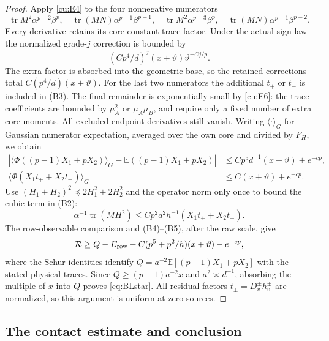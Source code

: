 \documentclass[10pt]{article}
\numberwithin{equation}{section}
\newcommand{\1}{\mathbf1}
\begin{document}
\begin{proof}
Apply \eqref{cu:E4} to the four nonnegative numerators
\[
 \operatorname{tr}M^2\alpha^{p-2}\beta^p,\quad
 \operatorname{tr}(MN)\alpha^{p-1}\beta^{p-1},\quad
 \operatorname{tr}M^2\alpha^{p-3}\beta^p,\quad
 \operatorname{tr}(MN)\alpha^{p-1}\beta^{p-2}.
\]
Every derivative retains its core-constant trace factor. Under the
actual sign law the normalized grade-$j$ correction is bounded by
\[
 (Cp^4/d)^j(x+\vartheta)\vartheta^{-Cj/p}.
\]
The extra factor is absorbed into the geometric base, so the retained
corrections total $C(p^4/d)(x+\vartheta)$.
For the last two numerators the additional $t_+$ or $t_-$ is included
in (B3). The final remainder is exponentially small by \eqref{cu:E6}:
the trace coefficients are bounded by $\mu_A^2$ or $\mu_A\mu_B$,
and require only a fixed number of extra core moments.
All excluded endpoint derivatives still vanish.
Writing $\langle\cdot\rangle_G$ for Gaussian numerator expectation,
averaged over the own core and divided by $F_H$, we obtain
\[
 \begin{aligned}
 \left|\langle\Phi((p-1)X_1+pX_2)\rangle_G
       -\mathbb E((p-1)X_1+pX_2)\right|
 &\le Cp^5d^{-1}(x+\vartheta)+e^{-cp},\\
 \langle\Phi(X_1t_++X_2t_-)\rangle_G
 &\le C(x+\vartheta)+e^{-cp}.
 \end{aligned}
 \tag{B4}
\]
Use $(H_1+H_2)^2\preceq2H_1^2+2H_2^2$ and the operator norm only
once to bound the cubic term in (B2):
\[
 \alpha^{-1}\operatorname{tr}(MH^2)
 \le Cp^2a^2h^{-1}(X_1t_++X_2t_-).
 \tag{B5}
\]
The row-observable comparison and (B4)--(B5), after the raw scale,
give
\[
 \mathcal R\ge Q-E_{\rm row}
                  -C(p^5+p^2/h)(x+\vartheta)-e^{-cp},
\]
where the Schur identities identify
$Q=a^{-2}\mathbb E[(p-1)X_1+pX_2]$ with the stated physical traces.
Since $Q\ge(p-1)a^{-2}x$ and $a^2\asymp d^{-1}$, absorbing the
multiple of $x$ into $Q$ proves \eqref{eq:BLstar}.
All residual factors $t_\pm=D_v^\pm h_v^\pm$ are normalized, so this
argument is uniform at zero sources.
\end{proof}


\subsection{The contact estimate and conclusion}
\end{document}
